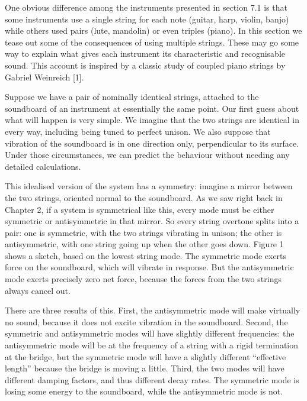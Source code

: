 

  One obvious difference among the instruments presented in section 7.1 is that 
  some instruments use a single string for each note (guitar, harp, violin, 
  banjo) while others used pairs (lute, mandolin) or even triples (piano). In 
  this section we tease out some of the consequences of using multiple strings. 
  These may go some way to explain what gives each instrument its 
  characteristic and recognisable sound. This account is inspired by a classic 
  study of coupled piano strings by Gabriel Weinreich [1]. 

  Suppose we have a pair of nominally identical strings, attached to the 
  soundboard of an instrument at essentially the same point. Our first guess 
  about what will happen is very simple. We imagine that the two strings are 
  identical in every way, including being tuned to perfect unison. We also 
  suppose that vibration of the soundboard is in one direction only, 
  perpendicular to its surface. Under those circumstances, we can predict the 
  behaviour without needing any detailed calculations. 

  This idealised version of the system has a symmetry: imagine a mirror between 
  the two strings, oriented normal to the soundboard. As we saw right back in 
  Chapter 2, if a system is symmetrical like this, every mode must be either 
  symmetric or antisymmetric in that mirror. So every string overtone splits 
  into a pair: one is symmetric, with the two strings vibrating in unison; the 
  other is antisymmetric, with one string going up when the other goes down. 
  Figure 1 shows a sketch, based on the lowest string mode. The symmetric mode 
  exerts force on the soundboard, which will vibrate in response. But the 
  antisymmetric mode exerts precisely zero net force, because the forces from 
  the two strings always cancel out. 


  There are three results of this. First, the antisymmetric mode will make 
  virtually no sound, because it does not excite vibration in the soundboard. 
  Second, the symmetric and antisymmetric modes will have slightly different 
  frequencies: the antisymmetric mode will be at the frequency of a string with 
  a rigid termination at the bridge, but the symmetric mode will have a 
  slightly different “effective length” because the bridge is moving a little. 
  Third, the two modes will have different damping factors, and thus different 
  decay rates. The symmetric mode is losing some energy to the soundboard, 
  while the antisymmetric mode is not. 

